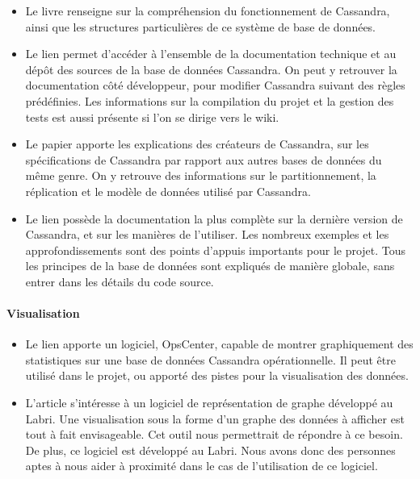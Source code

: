 \documentclass[12pt]{article}
\begin{document}
\begin{itemize}
\item Le livre \cite{Hewitt2010} renseigne sur la compréhension du fonctionnement de Cassandra, ainsi que les structures particulières de ce système de base de données.

\item Le lien \cite{ApacheCassandra09} permet d'accéder à l'ensemble de la documentation technique et au dépôt des sources de la base de données Cassandra. On peut y retrouver la documentation côté développeur, pour modifier Cassandra suivant des règles prédéfinies. Les informations sur la compilation du projet et la gestion des tests est aussi présente si l'on se dirige vers le wiki.

\item Le papier \cite{FacebookCassandra09} apporte les explications des créateurs de Cassandra, sur les spécifications de Cassandra par rapport aux autres bases de données du même genre. On y retrouve des informations sur le partitionnement, la réplication et le modèle de données utilisé par Cassandra.

\item Le lien \cite{DSDocCassandra15} possède la documentation la plus complète sur la dernière version de Cassandra, et sur les manières de l'utiliser.
Les nombreux exemples et les approfondissements sont des points d'appuis importants pour le projet. Tous les principes de la base de données sont expliqués de manière globale, sans entrer dans les détails du code source.

\end{itemize}

\paragraph{Visualisation}

\begin{itemize}
\item Le lien \cite{DSOpsCenter14} apporte un logiciel, OpsCenter, capable de montrer graphiquement des statistiques sur une base de données Cassandra opérationnelle. Il peut être utilisé dans le projet, ou apporté des pistes pour la visualisation des données.

\item L'article \cite{Tulip12} s'intéresse à un logiciel de représentation de graphe développé au Labri. Une visualisation sous la forme d'un graphe des données à afficher est tout à fait envisageable. Cet outil nous permettrait de répondre à ce besoin. De plus, ce logiciel est développé au Labri. Nous avons donc des personnes aptes à nous aider à proximité dans le cas de l'utilisation de ce logiciel.
\end{itemize} 
\end{document}
